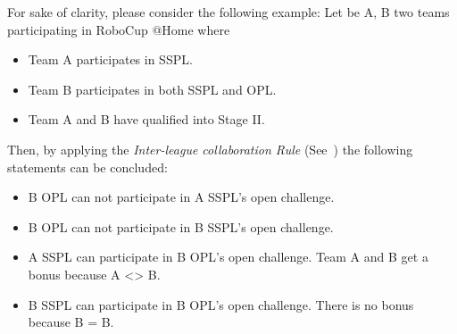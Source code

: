 For sake of clarity, please consider the following example: Let be A, B two teams participating in RoboCup @Home where
\begin{itemize}
	\item Team A participates in SSPL.
	\item Team B participates in both SSPL and OPL.
	\item Team A and B have qualified into Stage II.
\end{itemize}
Then, by applying the \textit{Inter-league collaboration Rule} (See~) the following statements can be concluded:
\begin{itemize}
	\item B OPL can not participate in A SSPL's open challenge.
	\item B OPL can not participate in B SSPL's open challenge.
	\item A SSPL can participate in B OPL's open challenge. Team A and B get a bonus because A <> B.
	\item B SSPL can participate in B OPL's open challenge. There is no bonus because B = B.
\end{itemize}




